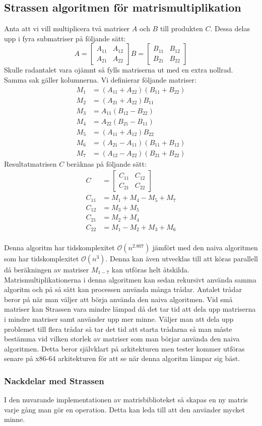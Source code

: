 \subsection{Strassen algoritmen för matrismultiplikation}
\label{sec:strassen}
Anta att vi vill multiplicera två matriser $A$ och $B$ till produkten $C$. Dessa delas upp i fyra submatriser på följande sätt:
 $$A=\begin{bmatrix}
A_{11} & A_{12} \\
A_{21}& A_{22}
 \end{bmatrix}
 B=\begin{bmatrix}
B_{11} & B_{12} \\
B_{21}& B_{22}
 \end{bmatrix}
 $$
 Skulle radantalet vara ojämnt så fylls matriserna ut med en extra nollrad. Samma sak gäller kolumnerna.
 Vi definierar följande matriser:
  \begin{align}
  M_1 & =(A_{11}+A_{22})(B_{11}+B_{22}) \\
  M_2 & =(A_{21}+A_{22})B_{11} \\
  M_3 & =A_{11}(B_{12}-B_{22}) \\
  M_4 & =A_{22}(B_{21}-B_{11}) \\
  M_5 & =(A_{11}+A_{12})B_{22} \\
  M_6 & =(A_{21}-A_{11})(B_{11}+B_{12}) \\
  M_7 & =(A_{12}-A_{22})(B_{21}+B_{22}) 
 \end{align}
 Resultatmatrisen $C$ beräknas på följande sätt:
   \begin{align}
    C & =\begin{bmatrix}
C_{11} & C_{12} \\
C_{21}& C_{22}
 \end{bmatrix} \\
  C_{11} & =M_1+M_4-M_5+M_7 \\
  C_{12} & = M_3+M_5 \\
  C_{21} & = M_2+M_4 \\
  C_{22} & = M_1-M_2+M_3+M_6
 \end{align}
 \\
Denna algoritm har tidskomplexitet $\mathcal{O}(n^{2.807})$ jämfört med den naiva algoritmen som har tidskomplexitet $\mathcal{O}(n^{3})$. Denna kan även utvecklas till att köras parallell då beräkningen av matriser $M_{1-7}$ kan utföras helt åtskilda. Matrismultiplikationerna i denna algoritmen kan sedan rekursivt använda samma algoritm och på så sätt kan processen använda många trådar. Antalet trådar beror på när man väljer att börja använda den naiva algoritmen. Vid små matriser kan Strassen vara mindre lämpad då det tar tid att dela upp matriserna i mindre matriser samt använder upp mer minne. Väljer man att dela upp problemet till flera trådar så tar det tid att starta trådarna så man måste bestämma vid vilken storlek av matriser som man börjar använda den naiva algoritmen. Detta beror självklart på arkitekturen men tester kommer utföras senare på x86-64 arkitekturen för att se när denna algoritm lämpar sig bäst. 
 \subsubsection{Nackdelar med Strassen}
 I den nuvarande implementationen av matrisbiblioteket så skapas en ny matris varje gång man gör en operation. Detta kan leda till att den använder mycket minne.
 

 
 
